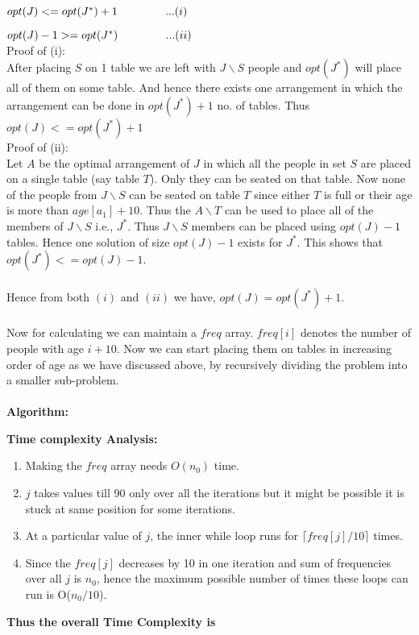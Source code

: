 \documentclass{article}
\begin{document}
$opt(J) <= opt(J^*) +1\hspace{1.5 cm}...(i)$

$opt(J)-1 >= opt(J^*)\hspace{1.5 cm}...(ii)$\\
Proof of (i):\\
After placing $S$ on 1 table we are left with $J\backslash S$ people and $opt(J^*)$ will place all of them on some table. And hence there exists one arrangement in which the arrangement can be done in $opt(J^*)+1$ no. of tables. Thus $opt(J) <= opt(J^*)+1$\\
Proof of (ii):\\
Let $A$ be the optimal arrangement of $J$ in which all the people in set $S$ are placed on a single table (say table $T$). Only they can be seated on that table. Now none of the people from $J\backslash S$ can be seated on table $T$ since either $T$ is full or their age is more than $age[a_1]+10$. Thus the $A\backslash T$ can be used to place all of the members of $J\backslash S$ i.e., $J^*$. Thus $J\backslash S$ members can be placed using $opt(J)-1$ tables. Hence one solution of size $opt(J)-1$ exists for $J^*$. This shows that $opt(J^*) <= opt(J)-1$.
\\\\
Hence from both $(i)$ and $(ii)$ we have, $opt(J)= opt(J^*)+1$.
\\\\
Now for calculating we can maintain a $freq$ array. $freq[i]$ denotes the number of people with age $i+10$. Now we can start placing them on tables in increasing order of age as we have discussed above, by recursively dividing the problem into a smaller sub-problem.
\\\\
\newpage
\textbf{Algorithm:}

\textbf{Time complexity Analysis:}
\begin{enumerate}
    \item Making the $freq$ array needs $O(n_0)$ time.
    \item $j$ takes values till 90 only over all the iterations but it might be possible it is stuck at same position for some iterations.
    \item At a particular value of $j$, the inner while loop runs for $\lceil{freq[j]/10}\rceil$ times.
    \item Since the $freq[j]$ decreases by 10 in one iteration and sum of frequencies over all $j$ is $n_0$, hence the maximum possible number of times these loops can run is O($n_0/10$).
\end{enumerate}
\textbf{Thus the overall Time Complexity is }
\end{document}
